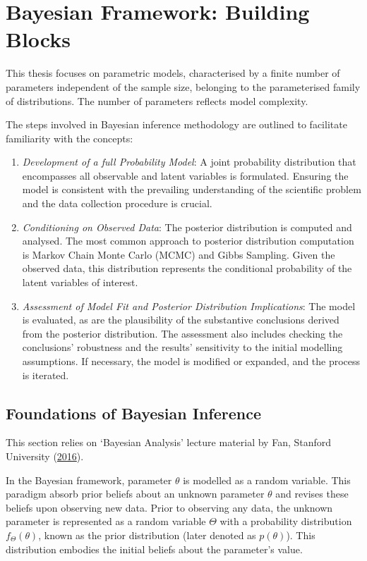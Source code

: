 \documentclass[
  11pt,
]{article}
\begin{document}
\newpage

\section{Bayesian Framework: Building Blocks}

This thesis focuses on parametric models, characterised by a finite
number of parameters independent of the sample size, belonging to the
parameterised family of distributions. The number of parameters reflects
model complexity.

The steps involved in Bayesian inference methodology are outlined to
facilitate familiarity with the concepts:

\begin{enumerate}
\def\labelenumi{\arabic{enumi}.}
\item
  \emph{Development of a full Probability Model}: A joint probability
  distribution that encompasses all observable and latent variables is
  formulated. Ensuring the model is consistent with the prevailing
  understanding of the scientific problem and the data collection
  procedure is crucial.
\item
  \emph{Conditioning on Observed Data}: The posterior distribution is
  computed and analysed. The most common approach to posterior
  distribution computation is Markov Chain Monte Carlo (MCMC) and Gibbs
  Sampling. Given the observed data, this distribution represents the
  conditional probability of the latent variables of interest.
\item
  \emph{Assessment of Model Fit and Posterior Distribution
  Implications}: The model is evaluated, as are the plausibility of the
  substantive conclusions derived from the posterior distribution. The
  assessment also includes checking the conclusions' robustness and the
  results' sensitivity to the initial modelling assumptions. If
  necessary, the model is modified or expanded, and the process is
  iterated.
\end{enumerate}

\subsection{Foundations of Bayesian Inference}

This section relies on `Bayesian Analysis' lecture material by Fan,
Stanford University (\protect\hyperlink{ref-Fan2016}{2016}).

In the Bayesian framework, parameter \(\theta\) is modelled as a random
variable. This paradigm absorb prior beliefs about an unknown parameter
\(\theta\) and revises these beliefs upon observing new data. Prior to
observing any data, the unknown parameter is represented as a random
variable \(\Theta\) with a probability distribution
\(f_\Theta(\theta)\), known as the prior distribution (later denoted as
\(p(\theta)\)). This distribution embodies the initial beliefs about the
parameter's value.
\end{document}
